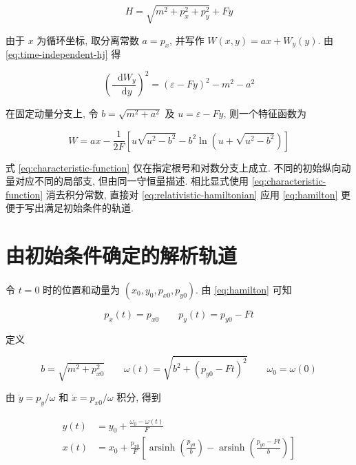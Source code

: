 \documentclass[UTF8, a4paper, 11pt]{ctexart}
\newcommand{\F}{F}
\newcommand{\dd}{\mathop{}\!\mathrm{d}}
\begin{document}
\begin{equation}
  H=\sqrt{m^2+p_x^2+p_y^2}+\F y
  \label{eq:relativistic-hamiltonian}
\end{equation}

由于 $x$ 为循环坐标, 取分离常数 $a=p_x$, 并写作 $W(x,y)=ax+W_y(y)$. 由 \eqref{eq:time-independent-hj} 得

\begin{equation}
  \left(\frac{\dd W_y}{\dd y}\right)^2
  =(\varepsilon-\F y)^2-m^2-a^2
  \label{eq:separated}
\end{equation}

在固定动量分支上, 令 $b=\sqrt{m^2+a^2}$ 及 $u=\varepsilon-\F y$, 则一个特征函数为

\begin{equation}
  W=ax-\frac{1}{2\F}
  \left[
    u\sqrt{u^2-b^2}
    -b^2\ln\left(u+\sqrt{u^2-b^2}\right)
  \right]
  \label{eq:characteristic-function}
\end{equation}

式 \eqref{eq:characteristic-function} 仅在指定根号和对数分支上成立. 不同的初始纵向动量对应不同的局部支, 但由同一守恒量描述. 相比显式使用 \eqref{eq:characteristic-function} 消去积分常数, 直接对 \eqref{eq:relativistic-hamiltonian} 应用 \eqref{eq:hamilton} 更便于写出满足初始条件的轨道.

\section{由初始条件确定的解析轨道}

令 $t=0$ 时的位置和动量为 $(x_0,y_0,p_{x0},p_{y0})$. 由 \eqref{eq:hamilton} 可知

\begin{equation}
  p_x(t)=p_{x0}
  \qquad
  p_y(t)=p_{y0}-\F t
  \label{eq:momentum-evolution}
\end{equation}

定义

\begin{equation}
  b=\sqrt{m^2+p_{x0}^2}
  \qquad
  \omega(t)=\sqrt{b^2+\left(p_{y0}-\F t\right)^2}
  \qquad
  \omega_0=\omega(0)
\end{equation}

由 $\dot y=p_y/\omega$ 和 $\dot x=p_{x0}/\omega$ 积分, 得到

\begin{align}
  y(t)
  &=y_0+\frac{\omega_0-\omega(t)}{\F}
  \label{eq:y-of-t}\\
  x(t)
  &=x_0+\frac{p_{x0}}{\F}
  \left[
    \operatorname{arsinh}\left(\frac{p_{y0}}{b}\right)
    -\operatorname{arsinh}\left(\frac{p_{y0}-\F t}{b}\right)
  \right]
  \label{eq:x-of-t}
\end{align}
\end{document}
